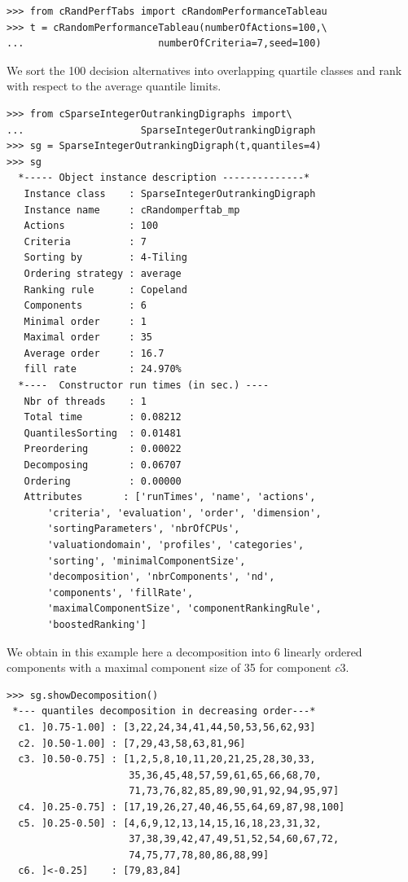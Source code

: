 \begin{lstlisting}
>>> from cRandPerfTabs import cRandomPerformanceTableau
>>> t = cRandomPerformanceTableau(numberOfActions=100,\
...                       numberOfCriteria=7,seed=100)
\end{lstlisting}

We sort the 100 decision alternatives into overlapping quartile classes and rank with respect to the average quantile limits.

\begin{lstlisting}[caption={Constructing the sparse integer outranking digraph},label=list:11.3]
>>> from cSparseIntegerOutrankingDigraphs import\
...                    SparseIntegerOutrankingDigraph
>>> sg = SparseIntegerOutrankingDigraph(t,quantiles=4)
>>> sg
  *----- Object instance description --------------*
   Instance class    : SparseIntegerOutrankingDigraph
   Instance name     : cRandomperftab_mp
   Actions           : 100
   Criteria          : 7
   Sorting by        : 4-Tiling
   Ordering strategy : average
   Ranking rule      : Copeland
   Components        : 6
   Minimal order     : 1
   Maximal order     : 35
   Average order     : 16.7
   fill rate         : 24.970%
  *----  Constructor run times (in sec.) ----
   Nbr of threads    : 1
   Total time        : 0.08212
   QuantilesSorting  : 0.01481
   Preordering       : 0.00022
   Decomposing       : 0.06707
   Ordering          : 0.00000
   Attributes       : ['runTimes', 'name', 'actions',
       'criteria', 'evaluation', 'order', 'dimension',
       'sortingParameters', 'nbrOfCPUs',
       'valuationdomain', 'profiles', 'categories',
       'sorting', 'minimalComponentSize',
       'decomposition', 'nbrComponents', 'nd',
       'components', 'fillRate',
       'maximalComponentSize', 'componentRankingRule',
       'boostedRanking']
\end{lstlisting}

We obtain in this example here a decomposition into 6 linearly ordered components with a maximal component size of 35 for component $c3$.

\begin{lstlisting}
>>> sg.showDecomposition()
 *--- quantiles decomposition in decreasing order---*
  c1. ]0.75-1.00] : [3,22,24,34,41,44,50,53,56,62,93]
  c2. ]0.50-1.00] : [7,29,43,58,63,81,96]
  c3. ]0.50-0.75] : [1,2,5,8,10,11,20,21,25,28,30,33,
                     35,36,45,48,57,59,61,65,66,68,70,
                     71,73,76,82,85,89,90,91,92,94,95,97]
  c4. ]0.25-0.75] : [17,19,26,27,40,46,55,64,69,87,98,100]
  c5. ]0.25-0.50] : [4,6,9,12,13,14,15,16,18,23,31,32,
                     37,38,39,42,47,49,51,52,54,60,67,72,
                     74,75,77,78,80,86,88,99]
  c6. ]<-0.25]    : [79,83,84]
\end{lstlisting}

